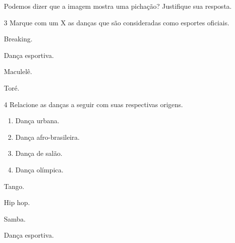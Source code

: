 Podemos dizer que a imagem mostra uma pichação? Justifique sua resposta.




\num{3}  Marque com um X as danças que são consideradas como esportes oficiais.

\begin{multicols}{2}
\begin{boxlist}
 Breaking.

 Dança esportiva.

 Maculelê.

 Toré.
\end{boxlist}
\end{multicols}


\pagebreak
\num{4}  Relacione as danças a seguir com suas respectivas origens.

\begin{multicols}{2}  
\begin{enumerate}
\item Dança urbana.

\item Dança afro-brasileira.

\item Dança de salão.

\item Dança olímpica.
\end{enumerate}
\end{multicols}

\begin{multicols}{2}
\begin{boxlist}
 Tango.

 Hip hop.

 Samba.

 Dança esportiva.
\end{boxlist}
\end{multicols}

